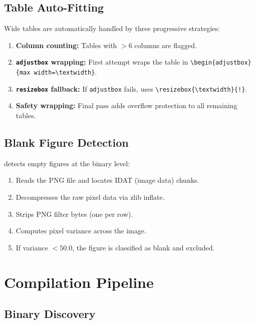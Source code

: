 \subsection{Table Auto-Fitting}

Wide tables are automatically handled by three progressive strategies:

\begin{enumerate}
  \item \textbf{Column counting:} Tables with $>$6 columns are flagged.
  \item \textbf{\texttt{adjustbox} wrapping:} First attempt wraps the table in \texttt{\textbackslash begin\{adjustbox\}\{max width=\textbackslash textwidth\}}.
  \item \textbf{\texttt{resizebox} fallback:} If \texttt{adjustbox} fails, uses \texttt{\textbackslash resizebox\{\textbackslash textwidth\}\{!\}}.
  \item \textbf{Safety wrapping:} Final pass adds overflow protection to all remaining tables.
\end{enumerate}

\subsection{Blank Figure Detection}

 detects empty figures at the binary level:

\begin{enumerate}
  \item Reads the PNG file and locates IDAT (image data) chunks.
  \item Decompresses the raw pixel data via zlib inflate.
  \item Strips PNG filter bytes (one per row).
  \item Computes pixel variance across the image.
  \item If variance $< 50.0$, the figure is classified as blank and excluded.
\end{enumerate}

\section{Compilation Pipeline}
\label{sec:paper:compilation}

\subsection{Binary Discovery}

